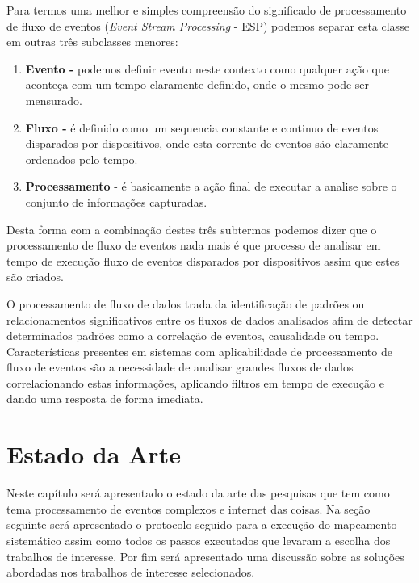 \documentclass[tid,table]{texufpel} %
\begin{document}
Para termos uma melhor e simples compreensão do significado de processamento de fluxo de eventos (\textit{Event Stream Processing} - ESP) podemos separar esta classe em outras três subclasses menores:
\begin{enumerate}
\item  \textbf{Evento -} podemos definir evento neste contexto como qualquer ação que aconteça com um tempo claramente definido, onde o mesmo pode ser mensurado.  

\item  \textbf{Fluxo -} é definido como um sequencia constante e continuo de eventos disparados por dispositivos, onde esta corrente de eventos são claramente ordenados pelo tempo.

\item  \textbf{Processamento} - é basicamente a ação final de executar a analise sobre o conjunto de informações capturadas.
\end{enumerate}
Desta forma com a combinação destes três subtermos podemos dizer que o processamento de fluxo de eventos nada mais é que processo de analisar em tempo de execução fluxo de eventos disparados por dispositivos assim que estes são criados. 

O processamento de fluxo de dados trada da identificação de padrões ou relacionamentos significativos entre os fluxos de dados analisados afim de detectar determinados padrões como a correlação de eventos, causalidade ou tempo.
Características presentes em sistemas com aplicabilidade de processamento de fluxo de eventos são a necessidade de analisar grandes fluxos de dados correlacionando estas informações, aplicando filtros em tempo de execução e dando uma resposta de forma imediata.


\chapter{Estado da Arte} 
\label{cap:Estado_da_Arte}

Neste capítulo será apresentado o estado da arte das pesquisas que tem como tema processamento de eventos complexos e internet das coisas. Na seção seguinte será apresentado o protocolo seguido para a execução do mapeamento sistemático assim como todos os passos executados que levaram a escolha dos trabalhos de interesse. Por fim será apresentado uma discussão sobre as soluções abordadas nos trabalhos de interesse selecionados.    
\end{document}
